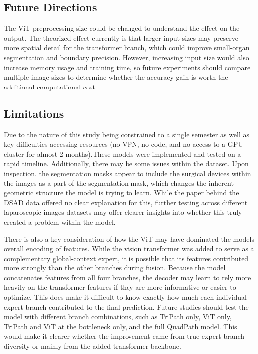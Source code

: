 \documentclass[twocolumn]{article}
\begin{document}
\subsection{Future Directions}
The ViT preprocessing size could be changed to understand the effect on the output. The theorized effect currently is that larger input sizes may preserve more spatial detail for the transformer branch, which could improve small-organ segmentation and boundary precision. However, increasing input size would also increase memory usage and training time, so future experiments should compare multiple image sizes to determine whether the accuracy gain is worth the additional computational cost.

\subsection{Limitations}

Due to the nature of this study being constrained to a single semester as well as key difficulties accessing resources (no VPN, no code, and no access to a GPU cluster for almost 2 months).These models were implemented and tested on a rapid timeline. Additionally, there may be some issues within the dataset. Upon inspection, the segmentation masks appear to include the surgical devices within the images as a part of the segmentation mask, which changes the inherent geometric structure the model is trying to learn. While the paper behind the DSAD data offered no clear explanation for this, further testing across different laparoscopic images datasets may offer clearer insights into whether this truly created a problem within the model. 

There is also a key consideration of how the ViT may have dominated the models overall encoding of features. While the vision transformer was added to serve as a complementary global-context expert, it is possible that its features contributed more strongly than the other branches during fusion. Because the model concatenates features from all four branches, the decoder may learn to rely more heavily on the transformer features if they are more informative or easier to optimize. This does make it difficult to know exactly how much each individual expert branch contributed to the final prediction. Future studies should test the model with different branch combinations, such as TriPath only, ViT only, TriPath and ViT at the bottleneck only, and the full QuadPath model. This would make it clearer whether the improvement came from true expert-branch diversity or mainly from the added transformer backbone.
\end{document}
